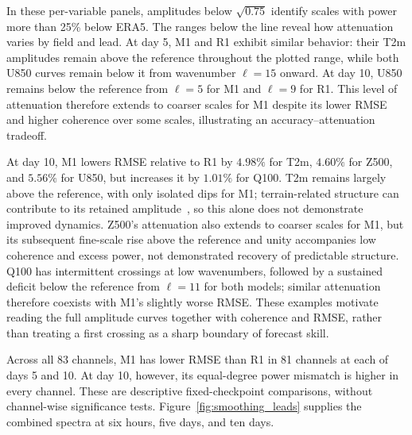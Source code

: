 \documentclass{article}
\newcommand{\vfourchange}[1]{{\color{blue}#1}}
\newcommand{\vfourred}[1]{{\color{red}#1}}
\newif\ifvfivechanges
\newcommand{\vfiveidentity}[1]{#1}
\DeclareRobustCommand{\vfiveadded}[1]{\ifvfivechanges{\color{vfiveAdded}%
  \let\vfourchange\vfiveidentity\let\vfourred\vfiveidentity#1}\else{\color{blue}%
  \let\vfourchange\vfiveidentity\let\vfourred\vfiveidentity#1}\fi}
\begin{document}
\vfiveadded{In these per-variable panels, amplitudes below $\sqrt{0.75}$ identify scales with power more than 25\% below ERA5. The ranges below the line reveal how attenuation varies by field and lead. At day 5, M1 and \vfourchange{R1} exhibit similar behavior: their T2m amplitudes remain above the reference throughout the plotted range, while both U850 curves remain below it from wavenumber $\ell=15$ onward. At day 10, U850 remains below the reference from $\ell=5$ for M1 and $\ell=9$ for \vfourchange{R1}. This level of attenuation therefore extends to coarser scales for M1 despite its lower RMSE and higher coherence over some scales, illustrating an accuracy--attenuation tradeoff.}

\vfiveadded{At day 10, M1 lowers RMSE relative to \vfourchange{R1} by $4.98\%$ for T2m, $4.60\%$ for Z500, and $5.56\%$ for U850, but increases it by $1.01\%$ for Q100. T2m remains largely above the reference, with only isolated dips for M1; terrain-related structure can contribute to its retained amplitude~\citep{subich2025spectral}, so this alone does not demonstrate improved dynamics. Z500's attenuation also extends to coarser scales for M1, but its subsequent fine-scale rise above the reference and unity accompanies low coherence and excess power, not demonstrated recovery of predictable structure. Q100 has intermittent crossings at low wavenumbers, followed by a sustained deficit below the reference from $\ell=11$ for both models; similar attenuation therefore coexists with M1's slightly worse RMSE. These examples motivate reading the full amplitude curves together with coherence and RMSE, rather than treating a first crossing as a sharp boundary of forecast skill.}

\vfiveadded{Across all 83 channels, M1 has lower RMSE than \vfourchange{R1} in 81 channels at each of days 5 and 10. At day 10, however, its equal-degree power mismatch is higher in every channel. These are descriptive fixed-checkpoint comparisons, without channel-wise significance tests. Figure~\ref{fig:smoothing_leads} supplies the combined spectra at six hours, five days, and ten days.}
\end{document}
